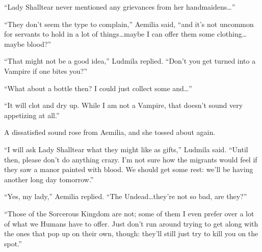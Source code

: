  

“Lady Shalltear never mentioned any grievances from her handmaidens…”

 

“They don’t seem the type to complain,” Aemilia said, “and it’s not uncommon for servants to hold in a lot of things…maybe I can offer them some clothing…maybe blood?”

 

“That might not be a good idea,” Ludmila replied. “Don’t you get turned into a Vampire if one bites you?”

 

“What about a bottle then? I could just collect some and…”

 

“It will clot and dry up. While I am not a Vampire, that doesn’t sound very appetizing at all.”

 

A dissatisfied sound rose from Aemilia, and she tossed about again.

 

“I will ask Lady Shalltear what they might like as gifts,” Ludmila said. “Until then, please don’t do anything crazy. I’m not sure how the migrants would feel if they saw a manor painted with blood. We should get some rest: we’ll be having another long day tomorrow.”

 

“Yes, my lady,” Aemilia replied. “The Undead…they’re not so bad, are they?”

 

“Those of the Sorcerous Kingdom are not; some of them I even prefer over a lot of what we Humans have to offer. Just don’t run around trying to get along with the ones that pop up on their own, though: they’ll still just try to kill you on the spot.”